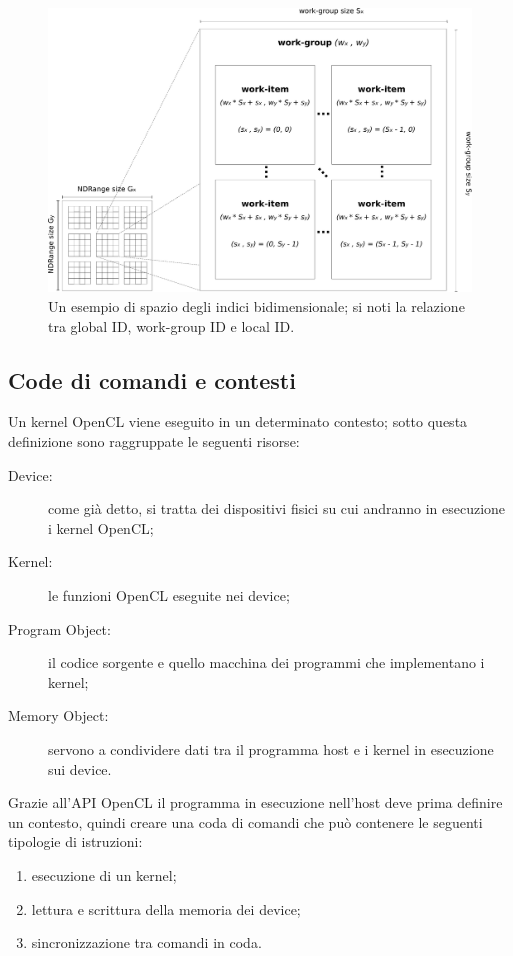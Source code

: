 \documentclass[12pt,a4paper,oneside]{book}
\begin{document}
\begin{figure}[t]
\begin{center}
\includegraphics[width=\textwidth]{img/opencl-ndrange}
\caption{Un esempio di spazio degli indici bidimensionale; si noti la relazione tra global ID, work-group ID e local ID.\label{fig:opencl-ndrange}}
\end{center}
\end{figure}

\subsection{Code di comandi e contesti}
\label{sec:opencl-code-contesti}

Un kernel \ac{OpenCL} viene eseguito in un determinato contesto; sotto questa definizione sono raggruppate le seguenti risorse:
\begin{description}
\item[Device:] come già detto, si tratta dei dispositivi fisici su cui andranno in esecuzione i kernel \ac{OpenCL};
\item[Kernel:] le funzioni \ac{OpenCL} eseguite nei device;
\item[Program Object:] il codice sorgente e quello macchina dei programmi che implementano i kernel;
\item[Memory Object:] servono a condividere dati tra il programma host e i kernel in esecuzione sui device.
\end{description}

Grazie all'\ac{API} \ac{OpenCL} il programma in esecuzione nell'host deve prima definire un contesto, quindi creare una coda di comandi che può contenere le seguenti tipologie di istruzioni:
\begin{enumerate}
\item esecuzione di un kernel;
\item lettura e scrittura della memoria dei device;
\item sincronizzazione tra comandi in coda.
\end{enumerate}
\end{document}
